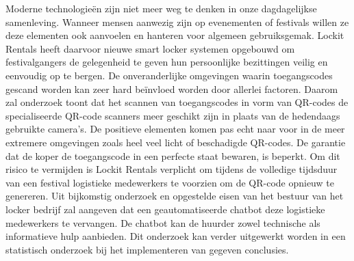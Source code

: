 Moderne technologieën zijn niet meer weg te denken in onze dagdagelijkse samenleving. Wanneer mensen aanwezig zijn op evenementen of festivals willen ze deze elementen ook aanvoelen en hanteren voor algemeen gebruiksgemak. Lockit Rentals heeft daarvoor nieuwe smart locker systemen opgebouwd om festivalgangers de gelegenheid te geven hun persoonlijke bezittingen veilig en eenvoudig op te bergen. De onveranderlijke omgevingen   waarin toegangscodes gescand worden kan zeer hard beïnvloed worden door allerlei factoren. Daarom zal onderzoek toont dat het scannen van toegangscodes in vorm van QR-codes de specialiseerde QR-code scanners meer geschikt zijn in plaats van de hedendaags gebruikte camera’s. De positieve elementen komen pas echt naar voor in de meer extremere omgevingen zoals heel veel licht of beschadigde QR-codes. De garantie dat de koper de toegangscode in een perfecte staat bewaren, is beperkt. Om dit risico te vermijden is Lockit Rentals verplicht om tijdens de volledige tijdsduur van een festival logistieke medewerkers te voorzien om de QR-code opnieuw te genereren. Uit bijkomstig onderzoek en opgestelde eisen van het bestuur van het locker bedrijf zal aangeven dat een geautomatiseerde chatbot deze logistieke medewerkers te vervangen. De chatbot kan de huurder zowel technische als informatieve hulp aanbieden. Dit onderzoek kan verder uitgewerkt worden in een statistisch onderzoek bij het implementeren van gegeven conclusies.
